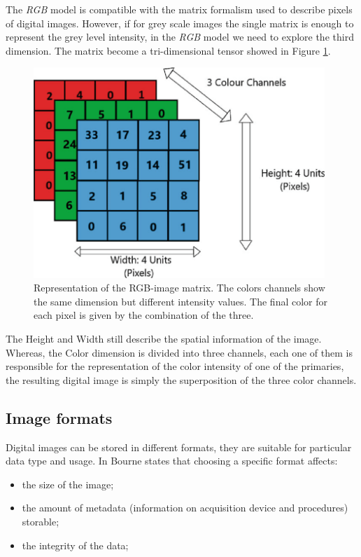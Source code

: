 \documentclass[../main.tex]{subfiles}
\begin{document}
The \textit{RGB} model is compatible with the matrix formalism used to describe pixels of digital images. However, if for grey scale images the single matrix is enough to represent the grey level intensity, in the \textit{RGB} model we need to explore the third dimension. The matrix become a tri-dimensional tensor showed in Figure \ref{fig:rgb}.

\begin{figure}[H] 
\begin{center}
\includegraphics[width=11cm]{images/rgb.png}
\caption{\small{Representation of the RGB-image matrix. The colors channels show the same dimension but different intensity values. The final color for each pixel is given by the combination of the three.}}\label{fig:rgb}
\end{center}
\end{figure}
The Height and Width still describe the spatial information of the image. Whereas, the Color dimension is divided into three channels, each one of them is responsible for the representation of the color intensity of one of the primaries, the resulting digital image is simply the superposition of the three color channels.




\subsection{Image formats}

Digital images can be stored in different formats, they are suitable for particular data type and usage.  In \cite{bourne2010fundamentals} Bourne states that choosing a specific format affects:
\begin{itemize}
    \item the size of the image;
    \item the amount of metadata (information on acquisition device and procedures) storable;
    \item the integrity of the data;
\end{itemize}
\end{document}
